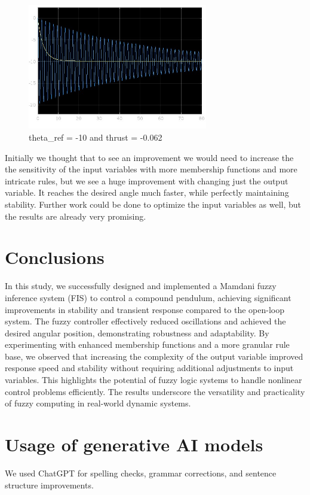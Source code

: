 \documentclass[12pt]{article}
\begin{document}
\begin{figure}[h!]
    \centering
    \includegraphics[width=0.7\textwidth]{complex2.jpg}
    \caption{theta\_ref = -10 and thrust = -0.062}
    \label{fig:complex2}
\end{figure}
\vspace{1cm}

Initially we thought that to see an improvement we would need to increase the the sensitivity of the input variables with more membership functions and more intricate rules, but we see a huge improvement with changing just the output variable. It reaches the desired angle much faster, while perfectly maintaining stability. Further work could be done to optimize the input variables as well, but the results are already very promising.

\section{Conclusions}  

In this study, we successfully designed and implemented a Mamdani fuzzy inference system (FIS) to control a compound pendulum, achieving significant improvements in stability and transient response compared to the open-loop system. The fuzzy controller effectively reduced oscillations and achieved the desired angular position, demonstrating robustness and adaptability. By experimenting with enhanced membership functions and a more granular rule base, we observed that increasing the complexity of the output variable improved response speed and stability without requiring additional adjustments to input variables. This highlights the potential of fuzzy logic systems to handle nonlinear control problems efficiently. The results underscore the versatility and practicality of fuzzy computing in real-world dynamic systems.

\section{Usage of generative AI models}

We used ChatGPT for spelling checks, grammar corrections, and sentence structure improvements. 
\end{document}
